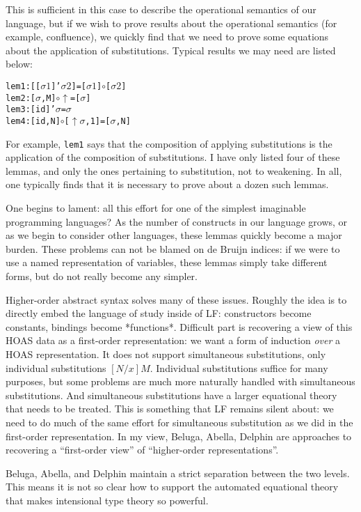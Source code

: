 \documentclass{article}
\begin{document}
This is sufficient in this case to describe the operational semantics
of our language, but if we wish to prove results about the operational
semantics (for example, confluence), we quickly find that we need to
prove some equations about the application of substitutions. Typical
results we may need are listed below:

\begin{alltt}
lem1 : [ [ \(\sigma1\) ]' \(\sigma2\) ] = [ \(\sigma1\) ] \(\circ\) [ \(\sigma2\) ]
lem2 : [ \(\sigma\) , M ] \(\circ\) \(\uparrow\) = [ \(\sigma\) ]
lem3 : [ id ]' \(\sigma\) = \(\sigma\)
lem4 : [ id , N ] \(\circ\) [ \(\uparrow\) \(\sigma\), 1 ] = [ \(\sigma\) , N ]
\end{alltt}

For example, \lstinline{lem1} says that the composition of applying
substitutions is the application of the composition of
substitutions. I have only listed four of these lemmas, and only the
ones pertaining to substitution, not to weakening. In all, one
typically finds that it is necessary to prove about a dozen such lemmas. 

One begins to lament: all this effort for one of the simplest imaginable programming
languages? As the number of constructs in our language grows, or as we
begin to consider other languages, these lemmas quickly become a major
burden. These problems can not be blamed on de Bruijn indices: if we were to use a named representation of variables, these
lemmas simply take different forms, but do not really become any
simpler.

Higher-order abstract syntax solves many of these issues. Roughly the
idea is to directly embed the language of study inside of LF:
constructors become constants, bindings become *functions*. Difficult
part is recovering a view of this HOAS data as a first-order
representation: we want a form of induction \emph{over} a HOAS representation.
 It does not support simultaneous substitutions, only
individual substitutions $[N/x]M$. Individual substitutions suffice
for many purposes, but some problems are much more naturally handled
with simultaneous substitutions. And simultaneous substitutions have a
larger equational theory that needs to be treated. This is something
that LF remains silent about: we need to do much of the same effort
for simultaneous substitution as we did in the first-order
representation. In my view, Beluga, Abella, Delphin are approaches to
recovering a ``first-order view'' of ``higher-order representations''.

Beluga, Abella, and Delphin maintain a strict
separation between the two levels. This means it is not so clear how
to support the automated equational theory that makes intensional type
theory so powerful.
\end{document}
